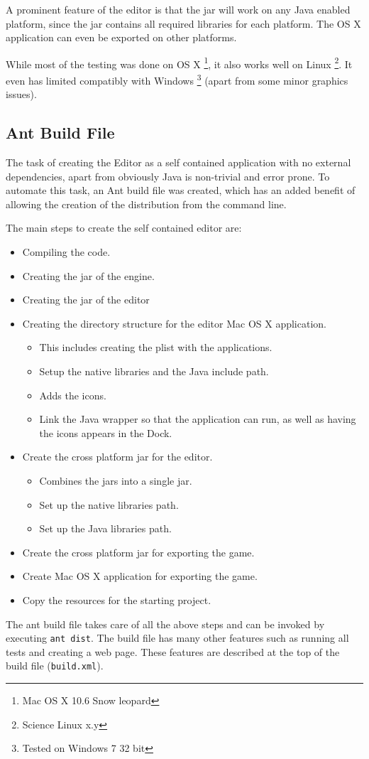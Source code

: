 A prominent feature of the editor is that the jar will work on any Java enabled platform, since the jar contains all required libraries for each platform. The OS X application can even be exported on other platforms.

While most of the testing was done on OS X \footnote{Mac OS X 10.6 Snow leopard}, it also works well on Linux \footnote{Science  Linux x.y}. It  even has limited compatibly with Windows \footnote{Tested on Windows 7 32 bit} (apart from some minor graphics issues).

\subsection{Ant Build File}

The task of creating the Editor as a self contained application with no external dependencies, apart from obviously Java is non-trivial and error prone.  To automate this task, an Ant build file was created, which has an added benefit of allowing the creation of the distribution from the command line. 

The main steps to create the self contained editor are:
\begin{itemize}
	\item Compiling the code.
	\item Creating the jar of the engine.
	\item Creating the jar of the editor
	\item Creating the directory structure for the editor Mac OS X application.
	\begin{itemize}[topsep=0mm,noitemsep ]
		\item This includes creating the plist\cite{plist} with the applications.
		\item Setup the native libraries and the Java include path.
		\item Adds the icons.
		\item Link the Java wrapper so that the application can run, as well as having the  icons appears in the Dock.
	\end{itemize}
	\item Create the cross platform jar for the editor. 
	\begin{itemize}[topsep=0mm,noitemsep ]
		\item Combines the jars into a single jar.
		\item Set up the native libraries path.
		\item Set up the Java libraries path.
	\end{itemize}
	\item Create the cross platform jar for exporting the game.
	\item Create Mac OS X application for exporting the game.
	\item Copy the resources for the starting project.
\end{itemize}

The ant build file takes care of all the above steps and can be invoked by executing \lstinline{ant dist}. The build file has many other features such as running all tests and creating a web page. These features are described at the top of the build file (\texttt{build.xml}).
